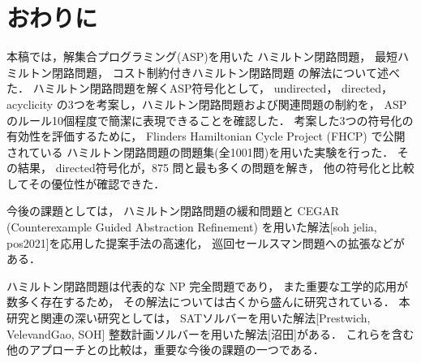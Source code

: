 ﻿%
\section{おわりに}\label{chap:conclusion}

本稿では，解集合プログラミング(ASP)を用いた
ハミルトン閉路問題，
最短ハミルトン閉路問題，
コスト制約付きハミルトン閉路問題
の解法について述べた．
%
ハミルトン閉路問題を解くASP符号化として，
\textsf{undirected}，
\textsf{directed}，
\textsf{acyclicity}
の3つを考案し，ハミルトン閉路問題および関連問題の制約を，
ASPのルール10個程度で簡潔に表現できることを確認した．
%
考案した3つの符号化の有効性を評価するために，
Flinders Hamiltonian Cycle Project (FHCP) で公開されている
ハミルトン閉路問題の問題集(全1001問)を用いた実験を行った．
その結果，
\textsf{directed}符号化が，875 問と最も多くの問題を解き，
他の符号化と比較してその優位性が確認できた．

今後の課題としては，
ハミルトン閉路問題の緩和問題と
CEGAR (Counterexample Guided Abstraction Refinement)
を用いた解法[soh jelia, pos2021]を応用した提案手法の高速化，
巡回セールスマン問題への拡張などがある．

ハミルトン閉路問題は代表的な NP 完全問題であり，
また重要な工学的応用が数多く存在するため，
その解法については古くから盛んに研究されている．
本研究と関連の深い研究としては，
SATソルバーを用いた解法[Prestwich, VelevandGao, SOH]
整数計画ソルバーを用いた解法[沼田]がある．
これらを含む他のアプローチとの比較は，重要な今後の課題の一つである．


